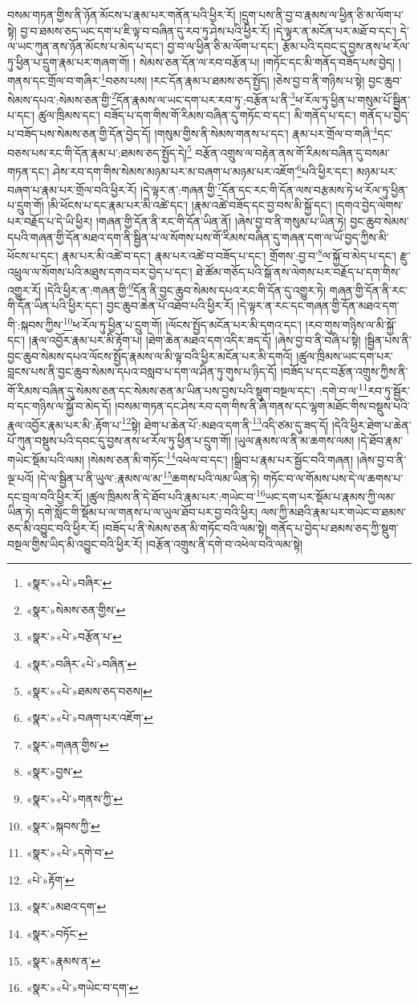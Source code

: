 བསམ་གཏན་གྱིས་ནི་ཉོན་མོངས་པ་རྣམ་པར་གནོན་པའི་ཕྱིར་རོ། །དྲུག་པས་ནི་བྱ་བ་རྣམས་ལ་ཕྱིན་ཅི་མ་ལོག་པ་སྟེ། བྱ་བ་ཐམས་ཅད་ཡང་དག་པ་ཇི་ལྟ་བ་བཞིན་དུ་རབ་ཏུ་ཤེས་པའི་ཕྱིར་རོ། །དེ་ལྟར་ན་མངོན་པར་མཐོ་བ་དང་། དེ་ལ་ཡང་ཀུན་ནས་ཉོན་མོངས་པ་མེད་པ་དང་། བྱ་བ་ལ་ཕྱིན་ཅི་མ་ལོག་པ་དང་། རྩོམ་པའི་དབང་དུ་བྱས་ནས་ཕ་རོལ་ཏུ་ཕྱིན་པ་དྲུག་རྣམ་པར་གཞག་གོ། །
སེམས་ཅན་དོན་ལ་རབ་བརྩོན་པ། །གཏོང་དང་མི་གནོད་བཟོད་པས་བྱེད། །གནས་དང་གྲོལ་བ་གཞིར་\footnote{«སྣར་»«པེ་»བཞིར་}བཅས་པས། །རང་དོན་རྣམ་པ་ཐམས་ཅད་སྤྱོད། །ཅེས་བྱ་བ་ནི་གཉིས་པ་སྟེ། བྱང་ཆུབ་སེམས་དཔའ་:སེམས་ཅན་གྱི་\footnote{«སྣར་»སེམས་ཅན་གྱིས་}དོན་རྣམས་ལ་ཡང་དག་པར་རབ་ཏུ་:བརྩོན་པ་ནི་\footnote{«སྣར་»«པེ་»བརྩོན་པ་}ཕ་རོལ་ཏུ་ཕྱིན་པ་གསུམ་པོ་སྦྱིན་པ་དང་། ཚུལ་ཁྲིམས་དང་། བཟོད་པ་དག་གིས་གོ་རིམས་བཞིན་དུ་གཏོང་བ་དང་། མི་གནོད་པ་དང་། གནོད་པ་བྱེད་པ་བཟོད་པས་སེམས་ཅན་གྱི་དོན་བྱེད་དོ། །གསུམ་གྱིས་ནི་སེམས་གནས་པ་དང་། རྣམ་པར་གྲོལ་བ་གཞི་\footnote{«སྣར་»བཞིར་«པེ་»བཞིན་}དང་བཅས་པས་རང་གི་དོན་རྣམ་པ་:ཐམས་ཅད་སྤྱོད་དེ།\footnote{«སྣར་»«པེ་»ཐམས་ཅད་བཅས།} བརྩོན་འགྲུས་ལ་བརྟེན་ནས་གོ་རིམས་བཞིན་དུ་བསམ་གཏན་དང་། ཤེས་རབ་དག་གིས་སེམས་མཉམ་པར་མ་བཞག་པ་མཉམ་པར་འཇོག་\footnote{«སྣར་»«པེ་»བཞག་པར་འཇོག་}པའི་ཕྱིར་དང་། མཉམ་པར་བཞག་པ་རྣམ་པར་གྲོལ་བའི་ཕྱིར་རོ། །དེ་ལྟར་ན་:གཞན་གྱི་\footnote{«སྣར་»གཞན་གྱིས་}དོན་དང་རང་གི་དོན་ལས་བརྩམས་ཏེ་ཕ་རོལ་ཏུ་ཕྱིན་པ་དྲུག་གོ། །མི་ཕོངས་པ་དང་རྣམ་པར་མི་འཚེ་དང་། །རྣམ་འཚེ་བཟོད་དང་བྱ་བས་མི་སྐྱོ་དང་། །དགའ་བྱེད་ལེགས་པར་བརྗོད་པ་དེ་ཡི་ཕྱིར། །གཞན་གྱི་དོན་ནི་རང་གི་དོན་ཡིན་ནོ། །ཞེས་བྱ་བ་ནི་གསུམ་པ་ཡིན་ཏེ། བྱང་ཆུབ་སེམས་དཔའི་གཞན་གྱི་དོན་མཐའ་དག་ནི་སྦྱིན་པ་ལ་སོགས་པས་གོ་རིམས་བཞིན་དུ་གཞན་དག་ལ་ཡོ་བྱད་ཀྱིས་མི་ཕོངས་པ་དང་། རྣམ་པར་མི་འཚེ་བ་དང་། རྣམ་པར་འཚེ་བ་བཟོད་པ་དང་། གྲོགས་:བྱ་བ་\footnote{«སྣར་»བྱས་}ལ་སྐྱོ་བ་མེད་པ་དང་། རྫུ་འཕྲུལ་ལ་སོགས་པའི་མཐུས་དགའ་བར་བྱེད་པ་དང་། ཐེ་ཚོམ་གཅོད་པའི་སྒོ་ནས་ལེགས་པར་བརྗོད་པ་དག་གིས་འགྱུར་རོ། །དེའི་ཕྱིར་ན་:གཞན་གྱི་\footnote{«སྣར་»«པེ་»གནས་ཀྱི་}དོན་ནི་བྱང་ཆུབ་སེམས་དཔའ་རང་གི་དོན་དུ་འགྱུར་ཏེ། གཞན་གྱི་དོན་ནི་རང་གི་དོན་ཡིན་པའི་ཕྱིར་དང་། བྱང་ཆུབ་ཆེན་པོ་འཐོབ་པའི་ཕྱིར་རོ། །དེ་ལྟར་ན་རང་དང་གཞན་གྱི་དོན་མཐའ་དག་གི་:སྐབས་ཀྱིས་\footnote{«སྣར་»སྐབས་ཀྱི་}ཕ་རོལ་ཏུ་ཕྱིན་པ་དྲུག་གོ། །ལོངས་སྤྱོད་མངོན་པར་མི་དགའ་དང་། །རབ་གུས་གཉིས་ལ་མི་སྐྱོ་དང་། །རྣལ་འབྱོར་རྣམ་པར་མི་རྟོག་པ། །ཐེག་ཆེན་མཐའ་དག་འདིར་ཟད་དོ། །ཞེས་བྱ་བ་ནི་བཞི་པ་སྟེ། །སྦྱིན་པས་ནི་བྱང་ཆུབ་སེམས་དཔའ་ལོངས་སྤྱོད་རྣམས་ལ་མི་ལྟ་བའི་ཕྱིར་མངོན་པར་མི་དགའོ། །ཚུལ་ཁྲིམས་ཡང་དག་པར་བླངས་པས་ནི་བྱང་ཆུབ་སེམས་དཔའ་བསླབ་པ་དག་ལ་ཤིན་ཏུ་གུས་པ་ཉིད་དོ། །བཟོད་པ་དང་བརྩོན་འགྲུས་ཀྱིས་ནི་གོ་རིམས་བཞིན་དུ་སེམས་ཅན་དང་སེམས་ཅན་མ་ཡིན་པས་བྱས་པའི་སྡུག་བསྔལ་དང་། :དགེ་བ་ལ་\footnote{«སྣར་»«པེ་»དགེ་བ་}རབ་ཏུ་སྦྱོར་བ་དང་གཉིས་ལ་སྐྱོ་བ་མེད་དོ། །བསམ་གཏན་དང་ཤེས་རབ་དག་གིས་ནི་ཞི་གནས་དང་ལྷག་མཐོང་གིས་བསྡུས་པའི་རྣལ་འབྱོར་རྣམ་པར་མི་:རྟོག་པ་\footnote{«པེ་»རྟོག་}སྟེ། ཐེག་པ་ཆེན་པོ་:མཐའ་དག་ནི་\footnote{«སྣར་»མཐའ་དག་}འདི་ཙམ་དུ་ཟད་དོ། །དེའི་ཕྱིར་ཐེག་པ་ཆེན་པོ་ཀུན་བསྡུས་པའི་དབང་དུ་བྱས་ནས་ཕ་རོལ་ཏུ་ཕྱིན་པ་དྲུག་གོ། །ཡུལ་རྣམས་ལ་ནི་མ་ཆགས་ལམ། །དེ་ཐོབ་རྣམ་གཡེང་སྡོམ་པའི་ལམ། །སེམས་ཅན་མི་གཏོང་\footnote{«སྣར་»བཏོང་}འཕེལ་བ་དང་། །སྒྲིབ་པ་རྣམ་པར་སྦྱོང་བའི་གཞན། །ཞེས་བྱ་བ་ནི་ལྔ་པའོ། །དེ་ལ་སྦྱིན་པ་ནི་ཡུལ་:རྣམས་ལ་མ་\footnote{«སྣར་»རྣམས་ན་}ཆགས་པའི་ལམ་ཡིན་ཏེ། གཏོང་བ་ལ་གོམས་པས་དེ་ལ་ཆགས་པ་དང་བྲལ་བའི་ཕྱིར་རོ། །ཚུལ་ཁྲིམས་ནི་དེ་ཐོབ་པའི་རྣམ་པར་:གཡེང་བ་\footnote{«སྣར་»«པེ་»གཡེང་བ་དག་}ཡང་དག་པར་སྡོམ་པ་རྣམས་ཀྱི་ལམ་ཡིན་ཏེ། དགེ་སློང་གི་སྡོམ་པ་ལ་གནས་པ་ལ་ཡུལ་ཐོབ་པར་བྱ་བའི་ཕྱིར། ལས་ཀྱི་མཐའི་རྣམ་པར་གཡེང་བ་ཐམས་ཅད་མི་འབྱུང་བའི་ཕྱིར་རོ། །བཟོད་པ་ནི་སེམས་ཅན་མི་གཏོང་བའི་ལམ་སྟེ། གནོད་པ་བྱེད་པ་ཐམས་ཅད་ཀྱི་སྡུག་བསྔལ་གྱིས་ཡིད་མི་འབྱུང་བའི་ཕྱིར་རོ། །བརྩོན་འགྲུས་ནི་དགེ་བ་འཕེལ་བའི་ལམ་སྟེ། 